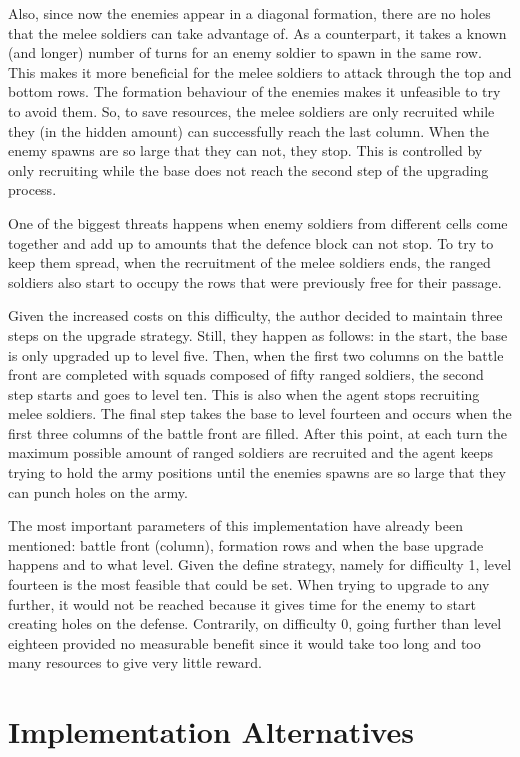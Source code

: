 \documentclass[conference]{IEEEtran}
\begin{document}
Also, since now the enemies appear in a diagonal formation, there are no holes that the melee soldiers can take advantage of. As a counterpart, it takes a known (and longer) number of turns for an enemy soldier to spawn in the same row. This makes it more beneficial for the melee soldiers to attack through the top and bottom rows. The formation behaviour of the enemies makes it unfeasible to try to avoid them. So, to save resources, the melee soldiers are only recruited while they (in the hidden amount) can successfully reach the last column. When the enemy spawns are so large that they can not, they stop. This is controlled by only recruiting while the base does not reach the second step of the upgrading process.

One of the biggest threats happens when enemy soldiers from different cells come together and add up to amounts that the defence block can not stop. To try to keep them spread, when the recruitment of the melee soldiers ends, the ranged soldiers also start to occupy the rows that were previously free for their passage.

Given the increased costs on this difficulty, the author decided to maintain three steps on the upgrade strategy. Still, they happen as follows: in the start, the base is only upgraded up to level five. Then, when the first two columns on the battle front are completed with squads composed of fifty ranged soldiers, the second step starts and goes to level ten. This is also when the agent stops recruiting melee soldiers. The final step takes the base to level fourteen and occurs when the first three columns of the battle front are filled. 
After this point, at each turn the maximum possible amount of ranged soldiers are recruited and the agent keeps trying to hold the army positions until the enemies spawns are so large that they can punch holes on the army.

The most important parameters of this implementation have already been mentioned: battle front (column), formation rows and when the base upgrade happens and to what level. Given the define strategy, namely for difficulty 1, level fourteen is the most feasible that could be set. When trying to upgrade to any further, it would not be reached because it gives time for the enemy to start creating holes on the defense. Contrarily, on difficulty 0, going further than level eighteen provided no measurable benefit since it would take too long and too many resources to give very little reward. 

\section{Implementation Alternatives}
\end{document}
